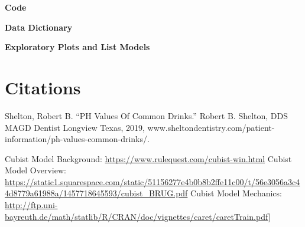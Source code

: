 \documentclass[]{report}
\begin{document}
\textbf{Code}

\textbf{Data Dictionary}

\textbf{Exploratory Plots and List Models}

\hypertarget{citations}{%
\chapter{Citations}\label{citations}}

Shelton, Robert B. ``PH Values Of Common Drinks.'' Robert B. Shelton,
DDS MAGD Dentist Longview Texas, 2019,
www.sheltondentistry.com/patient-information/ph-values-common-drinks/.

Cubist Model Background: \url{https://www.rulequest.com/cubist-win.html}
Cubist Model Overview:
\url{https://static1.squarespace.com/static/51156277e4b0b8b2ffe11c00/t/56e3056a3c44d8779a61988a/1457718645593/cubist_BRUG.pdf}
Cubist Model Mechanics:
\url{http://ftp.uni-bayreuth.de/math/statlib/R/CRAN/doc/vignettes/caret/caretTrain.pdf}{]}
\end{document}
